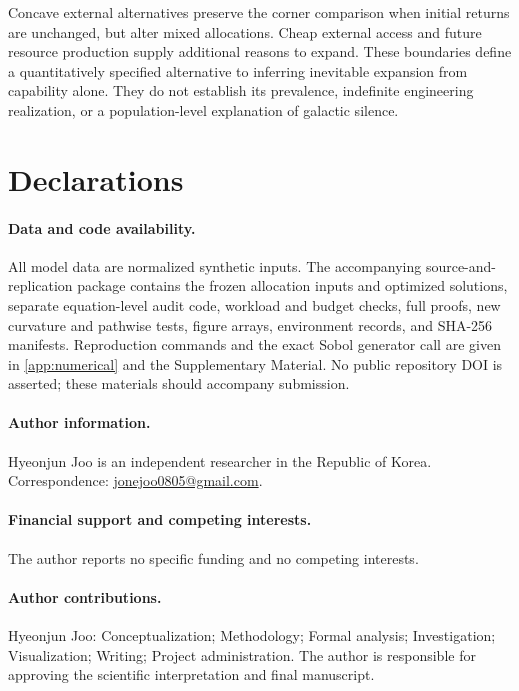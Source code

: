 \documentclass[11pt,a4paper]{article}
\theoremstyle{definition}\newtheorem{definition}{Definition}
\begin{document}
Concave external alternatives preserve the corner comparison when initial
returns are unchanged, but alter mixed allocations. Cheap external access
and future resource production supply additional reasons to expand.
These boundaries define a quantitatively specified alternative to
inferring inevitable expansion from capability alone.
They do not establish its prevalence, indefinite engineering realization,
or a population-level explanation of galactic silence.

\section*{Declarations}

\paragraph{Data and code availability.} All model data are normalized synthetic inputs. The accompanying source-and-replication package contains the frozen allocation inputs and optimized solutions, separate equation-level audit code, workload and budget checks, full proofs, new curvature and pathwise tests, figure arrays, environment records, and SHA-256 manifests. Reproduction commands and the exact Sobol generator call are given in \cref{app:numerical} and the Supplementary Material. No public repository DOI is asserted; these materials should accompany submission.

\paragraph{Author information.} Hyeonjun Joo is an independent researcher in the Republic of Korea. Correspondence: \href{mailto:jonejoo0805@gmail.com}{jonejoo0805@gmail.com}.

\paragraph{Financial support and competing interests.} The author reports no specific funding and no competing interests.

\paragraph{Author contributions.} Hyeonjun Joo: Conceptualization; Methodology; Formal analysis; Investigation; Visualization; Writing; Project administration. The author is responsible for approving the scientific interpretation and final manuscript.
\end{document}
